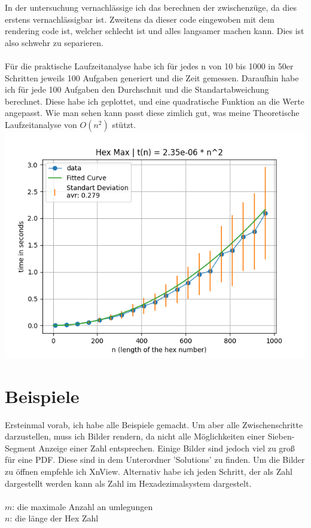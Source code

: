 \documentclass[a4paper,10pt,ngerman]{scrartcl}
\begin{document}
In der untersuchung vernachlässige ich das berechnen der zwischenzüge, da dies erstens vernachlässigbar ist. Zweitens da dieser code eingewoben mit dem rendering code ist, welcher schlecht ist und alles langsamer machen kann. Dies ist also schwehr zu separieren.
\\
\\
Für die praktische Laufzeitanalyse habe ich für jedes n von 10 bis 1000 in 50er Schritten jeweils 100 Aufgaben generiert und die Zeit gemessen. Daraufhin habe ich für jede 100 Aufgaben den Durchschnit und die Standartabweichung berechnet. Diese habe ich geplottet, und eine quadratische Funktion an die Werte angepasst. Wie man sehen kann passt diese zimlich gut, was meine Theoretische Laufzeitanalyse von $O(n^2)$ stützt.
\\
\includegraphics[width=\textwidth]{Laufzeit.png} 

\section{Beispiele}

Ersteinmal vorab, ich habe alle Beispiele gemacht. Um aber alle Zwischenschritte darzustellen, muss ich Bilder rendern, da nicht alle Möglichkeiten einer Sieben-Segment Anzeige einer Zahl entsprechen. Einige Bilder sind jedoch viel zu groß für eine PDF. Diese sind in dem Unterordner 'Solutions' zu finden. Um die Bilder zu öffnen empfehle ich XnView. Alternativ habe ich jeden Schritt, der als Zahl dargestellt werden kann als Zahl im Hexadezimalsystem dargestelt.
\\
\\
$m$: die maximale Anzahl an umlegungen
\\
$n$: die länge der Hex Zahl
\end{document}
